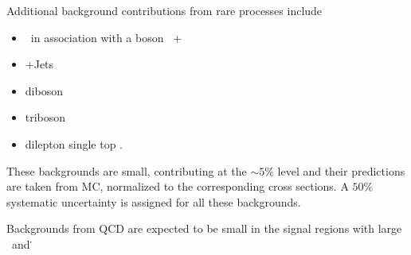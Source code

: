 Additional background contributions from rare processes include
\begin{itemize}
\item  \ttbar\ in association with a boson \ttbar\ + \W\/\dy\ \\
\item \dy+Jets \\
\item diboson \vv\ \\
\item triboson \vvv\ \\
\item dilepton single top \tw. \\
\end{itemize}
These backgrounds are small, contributing at the $\sim 5\%$ level and their predictions are taken 
from MC, normalized to the corresponding cross sections. A $50\%$ systematic uncertainty is 
assigned for all these backgrounds.

Backgrounds from QCD are expected to be small in the signal regions with large \mt\ and \met\.
